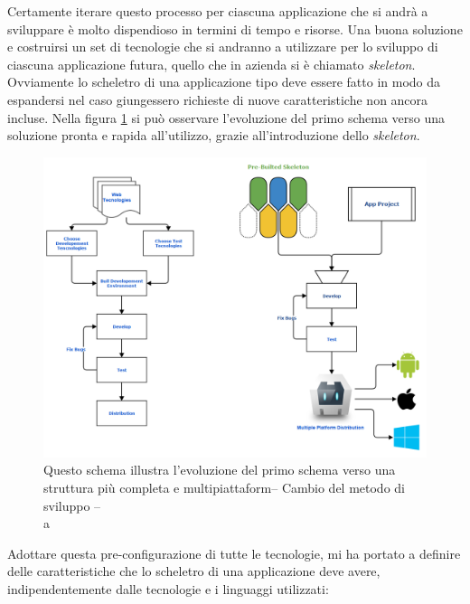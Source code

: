 Certamente iterare questo processo per ciascuna applicazione che si andrà a sviluppare è molto dispendioso in termini di tempo e risorse. Una buona soluzione e costruirsi un set di tecnologie che si andranno a utilizzare per lo sviluppo di ciascuna applicazione futura, quello che in azienda si è chiamato \emph{skeleton}. Ovviamente lo scheletro di una applicazione tipo deve essere fatto in modo da espandersi nel caso giungessero richieste di nuove caratteristiche non ancora incluse. Nella figura \ref{fig:flow_match} si può osservare l'evoluzione del primo schema verso una soluzione pronta e rapida all'utilizzo, grazie all'introduzione dello \emph{skeleton}.

\begin{figure}
	\begin{center}
		\includegraphics[scale=0.5]{Figures/match_flow.png}
		\caption[Schemi di sviluppo a confronto]{Questo schema illustra l'evoluzione del primo schema verso una struttura più completa e multipiattaform-- Cambio del metodo di sviluppo --\\a}
		\label{fig:flow_match}
	\end{center}
\end{figure}

Adottare questa pre-configurazione di tutte le tecnologie, mi ha portato a definire delle caratteristiche che lo scheletro di una applicazione deve avere, indipendentemente dalle tecnologie e i linguaggi utilizzati:

